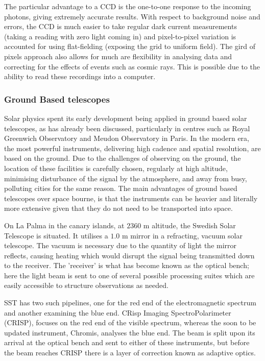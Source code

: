 The particular advantage to a CCD is the one-to-one response to the incoming photons, giving extremely accurate results.
With respect to background noise and errors, the CCD is much easier to take regular dark current measurements (taking a reading with zero light coming in) and pixel-to-pixel variation is accounted for using flat-fielding (exposing the grid to uniform field).
The gird of pixels approach also allows for much are flexibility in analysing data and correcting for the effects of events such as cosmic rays.
This is possible due to the ability to read these recordings into a computer.

\subsubsection{Ground Based telescopes}

Solar physics spent its early development being applied in ground based solar telescopes, as has already been discussed, particularly in centres such as Royal Greenwich Observatory and Meudon Observatory in Paris.
In the modern era, the most powerful instruments, delivering high cadence and spatial resolution, are based on the ground.
Due to the challenges of observing on the ground, the location of these facilities is carefully chosen, regularly at high altitude, minimising disturbance of the signal by the atmosphere, and away from busy, polluting cities for the same reason.
The main advantages of ground based telescopes over space bourne, is that the instruments can be heavier and literally more extensive given that they do not need to be transported into space.

On La Palma in the canary islands, at $2360$ m altitude, the Swedish Solar Telescope is situated.
It utilises a $1.0$ m mirror in a refracting, vacuum solar telescope.
The vacuum is necessary due to the quantity of light the mirror reflects, causing heating which would disrupt the signal being transmitted down to the receiver.
The 'receiver' is what has become known as the optical bench; here the light beam is sent to one of several possible processing suites which are easily accessible to structure observations as needed.

SST has two such pipelines, one for the red end of the electromagnetic spectrum and another examining the blue end.
CRisp Imaging SpectroPolarimeter (CRISP), focuses on the red end of the visible spectrum, whereas the soon to be updated instrument, Chromis, analyses the blue end.
The beam is split upon its arrival at the optical bench and sent to either of these instruments, but before the beam reaches CRISP there is a layer of correction known as adaptive optics.

